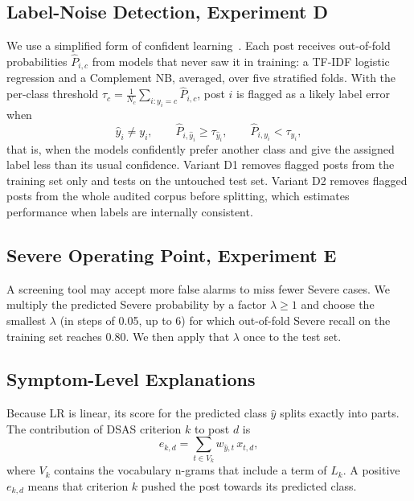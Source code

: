 \documentclass[conference]{IEEEtran}
\begin{document}
\subsection{Label-Noise Detection, Experiment D}

We use a simplified form of confident learning~\cite{northcutt2021confident}. Each post receives out-of-fold probabilities $\hat{P}_{i,c}$ from models that never saw it in training: a TF-IDF logistic regression and a Complement NB, averaged, over five stratified folds. With the per-class threshold $\tau_c=\frac{1}{N_c}\sum_{i:y_i=c}\hat{P}_{i,c}$, post $i$ is flagged as a likely label error when
\begin{equation}
\hat{y}_i\neq y_i,\qquad \hat{P}_{i,\hat{y}_i}\ge\tau_{\hat{y}_i},\qquad \hat{P}_{i,y_i}<\tau_{y_i},
\label{eq:cl}
\end{equation}
that is, when the models confidently prefer another class and give the assigned label less than its usual confidence. Variant D1 removes flagged posts from the training set only and tests on the untouched test set. Variant D2 removes flagged posts from the whole audited corpus before splitting, which estimates performance when labels are internally consistent.

\subsection{Severe Operating Point, Experiment E}

A screening tool may accept more false alarms to miss fewer Severe cases. We multiply the predicted Severe probability by a factor $\lambda\ge1$ and choose the smallest $\lambda$ (in steps of 0.05, up to 6) for which out-of-fold Severe recall on the training set reaches 0.80. We then apply that $\lambda$ once to the test set.

\subsection{Symptom-Level Explanations}

Because LR is linear, its score for the predicted class $\hat{y}$ splits exactly into parts. The contribution of DSAS criterion $k$ to post $d$ is
\begin{equation}
e_{k,d}=\sum_{t\in V_k} w_{\hat{y},t}\,x_{t,d},
\label{eq:expl}
\end{equation}
where $V_k$ contains the vocabulary n-grams that include a term of $L_k$. A positive $e_{k,d}$ means that criterion $k$ pushed the post towards its predicted class.
\end{document}
